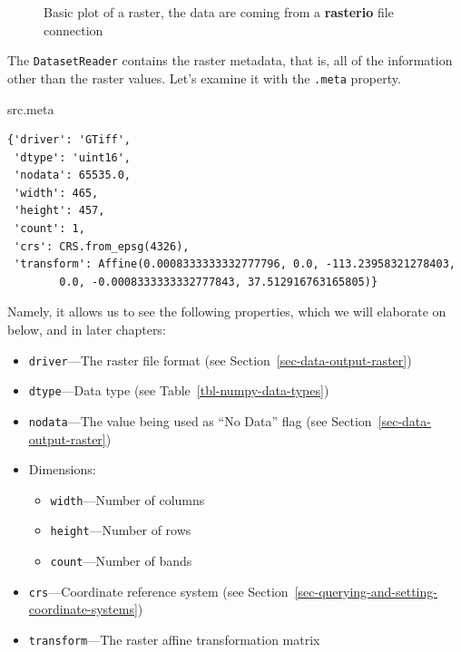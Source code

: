 \documentclass[
  letterpaper,
]{krantz}
\newenvironment{Shaded}{\begin{snugshade}}{\end{snugshade}}
\newcommand{\NormalTok}[1]{\textcolor[rgb]{0.00,0.23,0.31}{#1}}
\providecommand{\tightlist}{%
  \setlength{\itemsep}{0pt}\setlength{\parskip}{0pt}}\usepackage{longtable,booktabs,array}
\begin{document}
\begin{figure}[H]


\caption{\label{fig-rasterio-plot}Basic plot of a raster, the data are
coming from a \textbf{rasterio} file connection}

\end{figure}%

The \texttt{DatasetReader} contains the raster metadata, that is, all of
the information other than the raster values. Let's examine it with the
\texttt{.meta} property.

\begin{Shaded}
\begin{Highlighting}[]
\NormalTok{src.meta}
\end{Highlighting}
\end{Shaded}

\begin{verbatim}
{'driver': 'GTiff',
 'dtype': 'uint16',
 'nodata': 65535.0,
 'width': 465,
 'height': 457,
 'count': 1,
 'crs': CRS.from_epsg(4326),
 'transform': Affine(0.0008333333332777796, 0.0, -113.23958321278403,
        0.0, -0.0008333333332777843, 37.512916763165805)}
\end{verbatim}

Namely, it allows us to see the following properties, which we will
elaborate on below, and in later chapters:

\begin{itemize}
\tightlist
\item
  \texttt{driver}---The raster file format (see
  Section~\ref{sec-data-output-raster})
\item
  \texttt{dtype}---Data type (see Table~\ref{tbl-numpy-data-types})
\item
  \texttt{nodata}---The value being used as ``No Data'' flag (see
  Section~\ref{sec-data-output-raster})
\item
  Dimensions:

  \begin{itemize}
  \tightlist
  \item
    \texttt{width}---Number of columns
  \item
    \texttt{height}---Number of rows
  \item
    \texttt{count}---Number of bands
  \end{itemize}
\item
  \texttt{crs}---Coordinate reference system (see
  Section~\ref{sec-querying-and-setting-coordinate-systems})
\item
  \texttt{transform}---The raster affine transformation matrix
\end{itemize}
\end{document}
